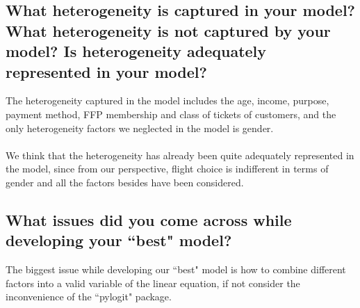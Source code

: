 \documentclass[11pt]{article}
\begin{document}
\subsection{\small{What heterogeneity is captured in your model? What heterogeneity is not captured by your model? Is heterogeneity adequately represented in your model?}}
The heterogeneity captured in the model includes the age, income, purpose, payment method, FFP membership and class of tickets of customers, and the only heterogeneity factors we neglected in the model is gender.\\\\ 
We think that the heterogeneity has already been quite adequately represented in the model, since from our perspective, flight choice is indifferent in terms of gender and all the factors besides have been considered.
\subsection{\small{What issues did you come across while developing your ``best" model?}}
The biggest issue while developing our ``best" model is how to combine different factors into a valid variable of the linear equation, if not consider the inconvenience of the ``pylogit" package.
\setcounter{subsection}{88}
\end{document}
